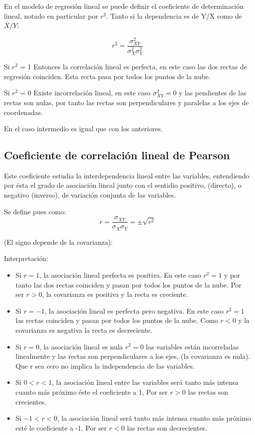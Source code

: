 \documentclass{article}
\theoremstyle{definition}
\begin{document}
En el modelo de regresión lineal se puede definir el coeficiente de
determinación lineal, notado en particular por $r^2$. Tanto si la dependencia es
de Y/X como de $X/Y$:

$$ r^2 = \frac{\sigma_{XY}^2}{ \sigma_{X}^2 \sigma_{Y}^2 } $$

Si $r^2$ = 1 Entonces la correlación lineal es perfecta, en este caso las dos
rectas de regresión coinciden. Esta recta pasa por todos los puntos de la nube.

Si $r^2$ = 0 Existe incorrelación lineal, en este caso $\sigma_{XY}^2 = 0$ y las
pendientes de las rectas son nulas, por tanto las rectas son perpendiculares y
paralelas a los ejes de coordenadas.

En el caso intermedio es igual que con los anteriores.

\subsection{Coeficiente de correlación lineal de Pearson}

Este coeficiente estudia la interdependencia lineal entre las variables,
entendiendo por ésta el grado de asociación lineal junto con el sentidio
positivo, (directo), o negativo (inverso), de variación conjunta de las
variables.

Se define pues como:
$$ r = \frac{\sigma_{XY}}{\sigma_{X} \sigma_{Y}}  = \pm \sqrt{r^2}$$

(El signo depende de la covarianza):

Interpretación:

\begin{itemize}

\item Si $r = 1$, la asociación lineal perfecta es positiva. En este caso $r^2 = 1$ y
por tanto las dos rectas coinciden y pasan por todos los puntos de la nube. Por
ser $r > 0$, la covarianza es positiva y la recta es creciente.

\item Si $r= -1$, la asociación lineal es perfecta pero negativa. En este caso $r^2 =
1$ las rectas coinciden y pasan por todos los puntos de la nube. Como $r < 0$ y
la covarianza es negativa la recta es decreciente.

\item Si $r = 0$, la asociación lineal es nula $r^2 = 0$ las variables están
incorreladas linealmente y las rectas son perpendiculares a los ejes, (la
covarianza es nula).  Que r sea cero no implica la independencia de las
variables.

\item Si $ 0 < r < 1 $, la asociación lineal entre las variables será tanto más intensa
cuanto más próximo éste el coeficiente a 1, Por ser $ r > 0 $ las rectas son
crecientes.

\item Si $ -1 < r < 0 $, la asociación lineal será tanto más intensa cuanto más próximo
esté le coeficiente a -1. Por ser $ r < 0$ las rectas son decrecientes.

\end{itemize}
\end{document}
